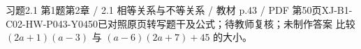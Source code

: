 \par\noindent\begin{minipage}{\linewidth}
\begin{bankitem}{习题2.1 第1题}{第2章 / 2.1 相等关系与不等关系 / 教材 p.43 / PDF 第50页}{XJ-B1-C02-HW-P043-Y0450}{已对照原页转写题干及公式；待教师复核；未制作答案}
比较 $(2a+1)(a-3)$ 与 $(a-6)(2a+7)+45$ 的大小。
\end{bankitem}
\end{minipage}\par\medskip
